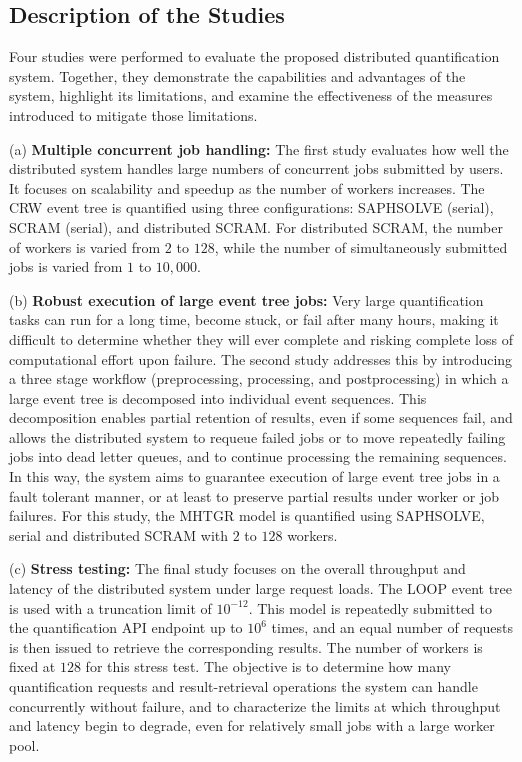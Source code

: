 \subsection{Description of the Studies}
Four studies were performed to evaluate the proposed distributed quantification system. Together, they demonstrate the capabilities and advantages of the system, highlight its limitations, and examine the effectiveness of the measures introduced to mitigate those limitations.

(a) \textbf{Multiple concurrent job handling:}
The first study evaluates how well the distributed system handles large numbers of concurrent jobs submitted by users. It focuses on scalability and speedup as the number of workers increases. The CRW event tree is quantified using three configurations: SAPHSOLVE (serial), SCRAM (serial), and distributed SCRAM. For distributed SCRAM, the number of workers is varied from $2$ to $128$, while the number of simultaneously submitted jobs is varied from $1$ to $10,000$.

(b) \textbf{Robust execution of large event tree jobs:}
Very large quantification tasks can run for a long time, become stuck, or fail after many hours, making it difficult to determine whether they will ever complete and risking complete loss of computational effort upon failure. The second study addresses this by introducing a three stage workflow (preprocessing, processing, and postprocessing) in which a large event tree is decomposed into individual event sequences. This decomposition enables partial retention of results, even if some sequences fail, and allows the distributed system to requeue failed jobs or to move repeatedly failing jobs into dead letter queues, and to continue processing the remaining sequences. In this way, the system aims to guarantee execution of large event tree jobs in a fault tolerant manner, or at least to preserve partial results under worker or job failures. For this study, the MHTGR model is quantified using SAPHSOLVE, serial and distributed SCRAM with $2$ to $128$ workers.

(c) \textbf{Stress testing:}
The final study focuses on the overall throughput and latency of the distributed system under large request loads. The LOOP event tree is used with a truncation limit of $10^{-12}$. This model is repeatedly submitted to the quantification API endpoint up to $10^{6}$ times, and an equal number of requests is then issued to retrieve the corresponding results. The number of workers is fixed at $128$ for this stress test. The objective is to determine how many quantification requests and result-retrieval operations the system can handle concurrently without failure, and to characterize the limits at which throughput and latency begin to degrade, even for relatively small jobs with a large worker pool.

